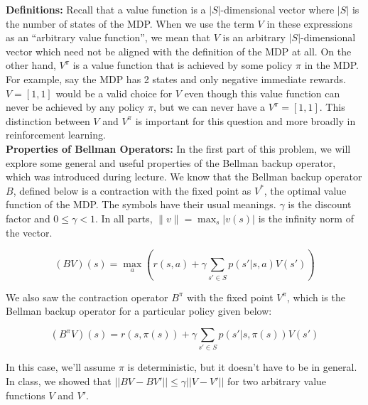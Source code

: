 \documentclass[11pt]{article}
\begin{document}
\noindent \textbf{Definitions:} \noindent Recall that a value function is a $|S|$-dimensional vector where $|S|$ is the number of states of the MDP. When we use the term $V$ in these expressions as an ``arbitrary value function'', we mean that $V$ is an arbitrary $|S|$-dimensional vector which need not be aligned with the definition of the MDP at all. 
On the other hand, $V^\pi$ is a value function that is achieved by some policy $\pi$ in the MDP.
For example, say the MDP has 2 states and only negative immediate rewards. $V = [1,1]$ would be a valid choice for $V$ even though this value function can never be achieved by any policy $\pi$, but we can never have a $V^\pi = [1,1]$. This distinction between $V$ and $V^\pi$ is important for this question and more broadly in reinforcement learning.
\\

\noindent \textbf{Properties of Bellman Operators:} In the first part of this problem, we will explore some general and useful properties of the Bellman backup operator, which was introduced during lecture. We know that the Bellman backup operator $B$, defined below is a contraction with the fixed point as $V^*$, the optimal value function of the MDP. The symbols have their usual meanings. $\gamma$ is the discount factor and $0 \leq \gamma < 1$. In all parts, $\|v\| = \max_{s} | v(s) |$ is the infinity norm of the vector.

\begin{equation}
    (BV)(s) = \max_a \left( r(s, a) + \gamma\sum_{s' \in S}p(s'|s,a)V(s') \right)
\end{equation}

\noindent We also saw the contraction operator $B^\pi$ with the fixed point $V^\pi$, which is the Bellman backup operator for a particular policy given below:

\begin{equation}
    (B^\pi V)(s) = r(s,\pi(s)) + \gamma\sum_{s' \in S}p(s'|s,\pi(s))V(s')
\end{equation}


\noindent In this case, we'll assume $\pi$ is deterministic, but it doesn't have to be in general. In class, we showed that $|| BV - BV' || \leq \gamma ||V - V'||$ for two arbitrary value functions $V$ and $V'$. 
\end{document}
